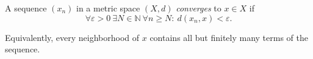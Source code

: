 
A sequence $(x_n)$ in a metric space $(X,d)$ \emph{converges} to $x\in X$ if
\[
\forall\varepsilon>0\ \exists N\in\mathbb N\
\forall n\ge N:\ d(x_n,x)<\varepsilon.
\]

Equivalently, every neighborhood of $x$ contains all but finitely many terms of the sequence.
